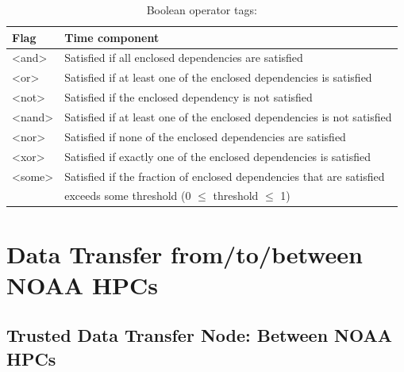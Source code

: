 \documentclass[11pt,fleqn]{report}              %
\begin{document}
\begin{enumerate}
\begin{enumerate}
\begin{table}[ht!]
\centering
\caption{Boolean operator tags:}
{\begin{tabular}{l | l  }
\hline
\hline
Flag & Time component  \\
\hline
<and> & Satisfied if all enclosed dependencies are satisfied \\
<or>  & Satisfied if at least one of the enclosed dependencies is satisfied \\
<not> & Satisfied if the enclosed dependency is not satisfied \\
<nand> & Satisfied if at least one of the enclosed dependencies is not satisfied \\
<nor> & Satisfied if none of the enclosed dependencies are satisfied \\
<xor> & Satisfied if exactly one of the enclosed dependencies is satisfied \\
<some> & Satisfied if the fraction of enclosed dependencies that are satisfied \\
              & exceeds some threshold (0 $\le$ threshold $\le$ 1) \\
\hline
\end{tabular}}
\label{table:boolean_tag}
\end{table}

\end{enumerate}

\end{enumerate}




\chapter{Data Transfer from/to/between NOAA HPCs}

\section{Trusted Data Transfer Node: Between NOAA HPCs}
\end{document}
